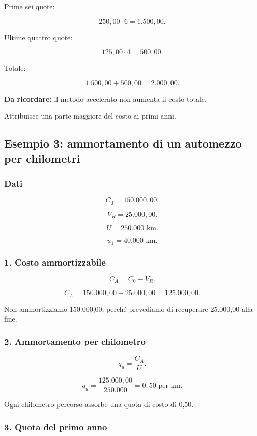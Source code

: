 \noindent Prime sei quote:

\[
250{,}00\cdot6=1.500{,}00.
\]

\noindent Ultime quattro quote:

\[
125{,}00\cdot4=500{,}00.
\]

\noindent Totale:

\[
1.500{,}00+500{,}00
=
\boxed{2.000{,}00}.
\]

\noindent \textbf{Da ricordare:}
il metodo accelerato
non aumenta il costo totale.

\noindent Attribuisce una parte maggiore
del costo ai primi anni.


\subsection{Esempio 3:
ammortamento di un automezzo per chilometri}

\subsubsection*{Dati}

\[
C_0=150.000{,}00.
\]

\[
V_R=25.000{,}00.
\]

\[
U=250.000\text{ km}.
\]

\[
u_1=40.000\text{ km}.
\]


\subsubsection*{1. Costo ammortizzabile}

\[
C_A=C_0-V_R.
\]

\[
C_A=150.000{,}00-25.000{,}00
=
\boxed{125.000{,}00}.
\]

\noindent Non ammortizziamo 150.000,00,
perché prevediamo di recuperare
25.000,00 alla fine.


\subsubsection*{2. Ammortamento per chilometro}

\[
q_u=\frac{C_A}{U}.
\]

\[
q_u=
\frac{125.000{,}00}{250.000}
=
\boxed{0{,}50\text{ per km}}.
\]

\noindent Ogni chilometro percorso
assorbe una quota di costo di 0,50.


\subsubsection*{3. Quota del primo anno}

